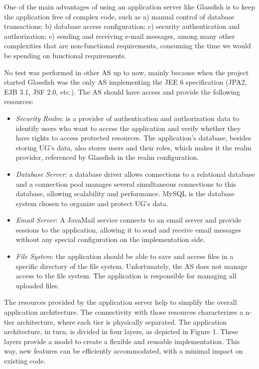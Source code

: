 \documentclass[envcountsame,envcountchap]{svmono}
\begin{document}
One of the main advantages of using an application server like Glassfish is to keep the application free of complex code, such as a) manual control of database transactions; b) database access configuration; c) security authentication and authorization; e) sending and receiving e-mail messages, among many other complexities that are non-functional requirements, consuming the time we would be spending on functional requirements.

No test was performed in other AS up to now, mainly because when the project started Glassfish was the only AS implementing the JEE 6 specification (JPA2, EJB 3.1, JSF 2.0, etc.). The AS should have access and provide the following resources:

\begin{itemize}
\item \textit{Security Realm}: is a provider of authentication and authorization data to identify users who want to access the application and verify whether they have rights to access protected resources.  The application's database, besides storing UG's data, also stores users and their roles, which makes it the realm provider, referenced by Glassfish in the realm configuration.

\item \textit{Database Server}: a database driver allows connections to a relational database and a connection pool manages several simultaneous connections to this database, allowing scalability and performance. MySQL is the database system chosen to organize and protect UG's data.

\item \textit{Email Server}: A JavaMail service connects to an email server and provide sessions to the application, allowing it to send and receive email messages without any special configuration on the implementation side.

\item \textit{File System}: the application should be able to save and access files in a specific directory of the file system. Unfortunately, the AS does not manage access to the file system. The application is responsible for managing all uploaded files.
\end{itemize}

The resources provided by the application server help to simplify the overall application architecture. The connectivity with those resources characterizes a n-tier architecture, where each tier is physically separated. The application architecture, in turn, is divided in four layers, as depicted in Figure 1. These layers provide a model to create a flexible and reusable implementation. This way, new features can be efficiently accommodated, with a minimal impact on existing code.
\end{document}
